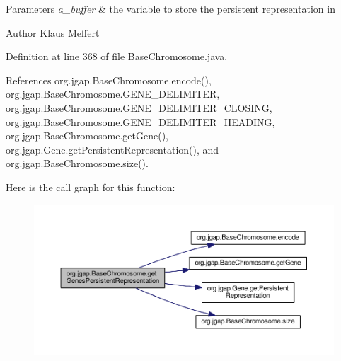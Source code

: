 \begin{DoxyParams}{Parameters}
{\em a\-\_\-buffer} & the variable to store the persistent representation in\\
\hline
\end{DoxyParams}
\begin{DoxyAuthor}{Author}
Klaus Meffert 
\end{DoxyAuthor}


Definition at line 368 of file Base\-Chromosome.\-java.



References org.\-jgap.\-Base\-Chromosome.\-encode(), org.\-jgap.\-Base\-Chromosome.\-G\-E\-N\-E\-\_\-\-D\-E\-L\-I\-M\-I\-T\-E\-R, org.\-jgap.\-Base\-Chromosome.\-G\-E\-N\-E\-\_\-\-D\-E\-L\-I\-M\-I\-T\-E\-R\-\_\-\-C\-L\-O\-S\-I\-N\-G, org.\-jgap.\-Base\-Chromosome.\-G\-E\-N\-E\-\_\-\-D\-E\-L\-I\-M\-I\-T\-E\-R\-\_\-\-H\-E\-A\-D\-I\-N\-G, org.\-jgap.\-Base\-Chromosome.\-get\-Gene(), org.\-jgap.\-Gene.\-get\-Persistent\-Representation(), and org.\-jgap.\-Base\-Chromosome.\-size().



Here is the call graph for this function\-:
\nopagebreak
\begin{figure}[H]
\begin{center}
\leavevmode
\includegraphics[width=350pt]{classorg_1_1jgap_1_1_base_chromosome_a2bef76845dd6e92c09037dae72e7ca15_cgraph}
\end{center}
\end{figure}


